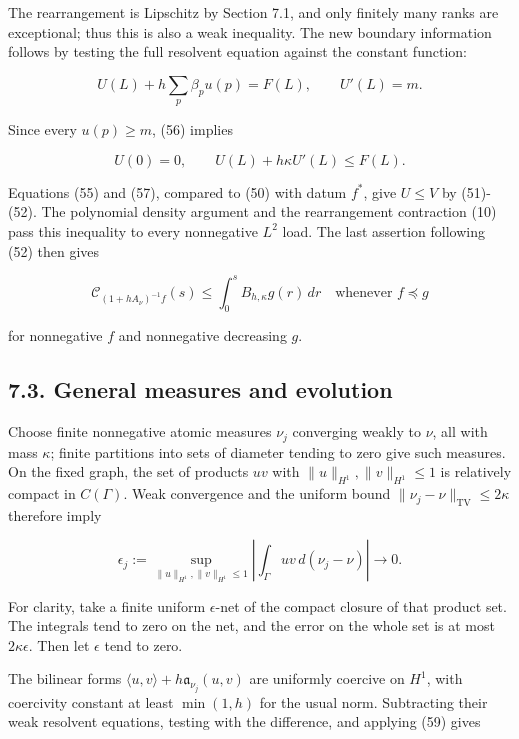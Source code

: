 \documentclass[11pt]{article}
\begin{document}
The rearrangement is Lipschitz by Section 7.1, and only finitely many
ranks are exceptional; thus this is also a weak inequality. The new
boundary information follows by testing the full resolvent equation
against the constant function:

\[
U(L)+h\sum_p\beta_pu(p)=F(L),
\qquad U'(L)=m.
\tag{56}
\]

Since every \(u(p)\ge m\), (56) implies

\[
U(0)=0,\qquad U(L)+h\kappa U'(L)\le F(L).
\tag{57}
\]

Equations (55) and (57), compared to (50) with datum \(f^*\), give
\(U\le V\) by (51)-(52). The polynomial density argument and the
rearrangement contraction (10) pass this inequality to every nonnegative
\(L^2\) load. The last assertion following (52) then gives

\[
\mathcal C_{(1+hA_\nu)^{-1}f}(s)
\le\int_0^s B_{h,\kappa}g(r)\,dr
\quad\text{whenever } f\preccurlyeq g
\tag{58}
\]

for nonnegative \(f\) and nonnegative decreasing \(g\).

\subsection{7.3. General measures and
evolution}\label{general-measures-and-evolution}

Choose finite nonnegative atomic measures \(\nu_j\) converging weakly to
\(\nu\), all with mass \(\kappa\); finite partitions into sets of
diameter tending to zero give such measures. On the fixed graph, the set
of products \(uv\) with \(\|u\|_{H^1},\|v\|_{H^1}\le1\) is relatively
compact in \(C(\Gamma)\). Weak convergence and the uniform bound
\(\|\nu_j-\nu\|_{\mathrm{TV}}\le2\kappa\) therefore imply

\[
\epsilon_j:=\sup_{\|u\|_{H^1},\|v\|_{H^1}\le1}
\left|\int_\Gamma uv\,d(\nu_j-\nu)\right|\longrightarrow0.
\tag{59}
\]

For clarity, take a finite uniform \(\epsilon\)-net of the compact
closure of that product set. The integrals tend to zero on the net, and
the error on the whole set is at most \(2\kappa\epsilon\). Then let
\(\epsilon\) tend to zero.

The bilinear forms \(\langle u,v\rangle+h\mathfrak a_{\nu_j}(u,v)\) are
uniformly coercive on \(H^1\), with coercivity constant at least
\(\min(1,h)\) for the usual norm. Subtracting their weak resolvent
equations, testing with the difference, and applying (59) gives
\end{document}
